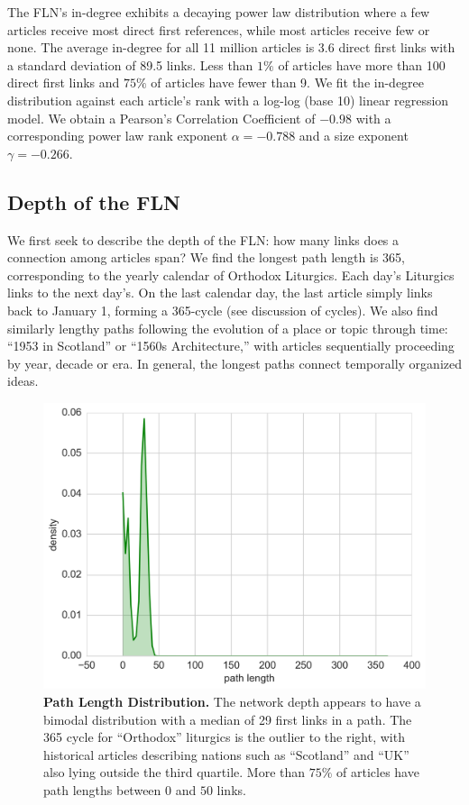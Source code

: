 \documentclass[11pt]{report}
\begin{document}
The FLN's in-degree exhibits a decaying power law distribution where a few articles 
receive most direct first references, while most articles receive few or none.
The average in-degree for all 11 million articles is 3.6 direct first links with a standard deviation of 89.5 links.
Less than $1\%$ of articles have more than 100 direct first links and $75\%$ of articles
have fewer than 9. 
We fit the in-degree distribution against each article's rank with a log-log (base 10) linear regression model.
We obtain a Pearson's Correlation Coefficient of $-0.98$
with a corresponding  power law rank exponent $\alpha = -0.788$ and a size exponent $\gamma = -0.266$. 


\subsection{Depth of the FLN}

We first seek to describe the depth of the FLN: how many links does a 
connection among articles span? 
We find the longest path length is 365,
corresponding to the yearly calendar of Orthodox Liturgics.
Each day's Liturgics links to the next day's. On the last calendar day, the last article simply links back to January 1, forming a 365-cycle 
(see discussion of cycles).
We also find similarly lengthy paths following the evolution of a place or topic through time: 
``1953 in Scotland'' or ``1560s Architecture,'' with articles sequentially proceeding by year, decade or era.
In general, the longest paths connect temporally organized ideas.

\begin{figure}[tp!]
  \includegraphics[width=\columnwidth]{graphics/path_lengths_dist.png}
  \caption{
    \textbf{Path Length Distribution.}
The network depth appears to have a bimodal distribution with a median of 29 first links in a path.
The 365 cycle for ``Orthodox'' liturgics is the outlier to the right, with historical articles 
describing nations such as ``Scotland'' and ``UK'' also lying outside the third quartile.
More than $75\%$ of articles have path lengths between 
$0$ and $50$ links.}
  \label{fig:Path Length Distribution}
\end{figure}
\end{document}
